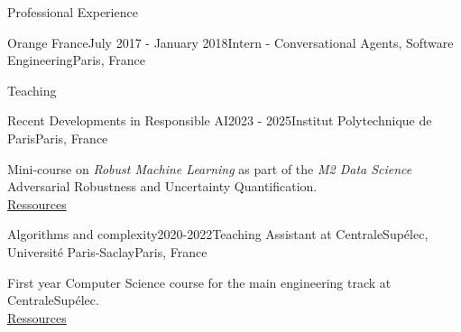 \documentclass{resume} %
\begin{document}
\begin{rSection}{Professional Experience}

\begin{rSubsection}{Orange France}{July 2017 - January 2018}{Intern - Conversational Agents, Software Engineering}{Paris, France}
\item[] 
\vspace{-15pt}
\end{rSubsection}
\vspace{-18pt}

\end{rSection}


\begin{rSection}{Teaching}

\begin{rSubsection}{Recent Developments in Responsible AI}{2023 - 2025}{Institut Polytechnique de Paris}{Paris, France}
    \item[] Mini-course on \emph{Robust Machine Learning} as part of the \textit{M2 Data Science} \\
    Adversarial Robustness and Uncertainty Quantification. \\
    \href{https://responsible-ai-datascience-ipparis.github.io/}{Ressources}
\end{rSubsection}

\begin{rSubsection}{Algorithms and complexity}{2020-2022}{Teaching Assistant at CentraleSupélec, Université Paris-Saclay}{Paris, France}
    \item[] First year Computer Science course for the main engineering track at CentraleSupélec. \\
    \href{https://wdi.centralesupelec.fr/1CC2000/}{Ressources}
\end{rSubsection}

\end{rSection}


\end{document}
